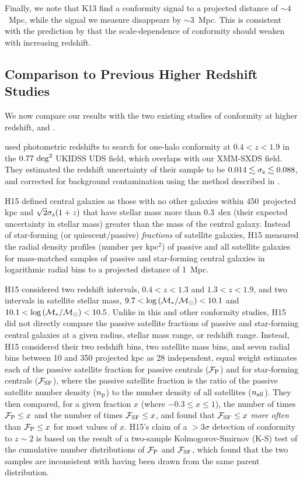 Finally, we note that K13 find a conformity signal to a projected distance of $\sim4$~Mpc, while the signal we measure disappears by $\sim3$~Mpc.
This is consistent with the prediction by \citet{Hearin15b} that the scale-dependence of conformity should weaken with increasing redshift.

\subsection{Comparison to Previous Higher Redshift Studies}\label{sec:compare_high}

We now compare our results with the two existing studies of conformity at higher redshift, \citet{Hartley15} and \citet{Kawinwanichakij16}.

\citet[][hereafter H15]{Hartley15} used photometric redshifts to search for one-halo conformity at ${0.4<z<1.9}$ in the ${0.77~\degsq}$ UKIDSS UDS field, which overlaps with our XMM-SXDS field.
They estimated the redshift uncertainty of their sample to be ${0.014 \lesssim \sigmaz \lesssim 0.088}$, and corrected for background contamination using the method described in \citet{Chen06}.

H15 defined central galaxies as those with no other galaxies within 450~projected kpc and ${\sqrt{2}\sigmaz(1 + z)}$
that have stellar mass more than 0.3~dex (their expected uncertainty in stellar mass) greater than the mass of the central galaxy.
Instead of star-forming (or quiescent/passive) \emph{fractions} of satellite galaxies,
H15 measured the radial density profiles (number per kpc$^2$) of passive and all satellite galaxies for mass-matched samples of passive and star-forming central galaxies in logarithmic radial bins to a projected distance of 1~Mpc.

H15 considered two redshift intervals, ${0.4<z<1.3}$ and ${1.3<z<1.9}$, and two intervals in satellite stellar mass, ${9.7<\logM<10.1}$ and ${10.1<\logM<10.5}$.
Unlike in this and other conformity studies, H15 did not directly compare the passive satellite fractions of passive and star-forming central galaxies at a given radius, stellar mass range, or redshift range.
Instead, H15 considered their two redshift bins, two satellite mass bins, and seven radial bins between 10 and 350 projected kpc as 28 independent, equal weight 
estimates each of the passive satellite fraction for passive centrals ($\fP$) and for star-forming centrals ($\fSF$), where the passive satellite fraction is the ratio of the passive satellite number density ($\np$) to the number density of all satellites ($\nall$).
They then compared, for a given fraction $x$ (where ${-0.3 \le x \le 1}$), the number of times ${\fP \le x}$ and the number of times ${\fSF \le x}$, and found that ${\fSF \le x}$ \emph{more often} than ${\fP \le x}$ for most values of $x$.
H15's claim of a $>3\sigma$ detection of conformity to $z\sim2$ is based on the result of a two-sample Kolmogorov-Smirnov (K-S) test of the cumulative number distributions of $\fP$ and $\fSF$, which found that the two samples are inconsistent with having been drawn from the same parent distribution.

